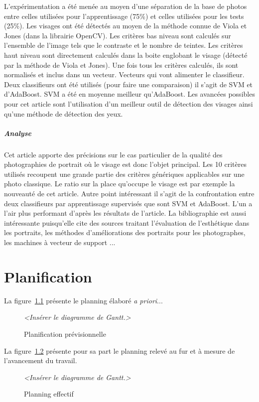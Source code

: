 \documentclass[11pt, french]{report-rd-info}
\begin{document}
L'expérimentation a été menée au moyen d’une séparation de la base de photos entre celles utilisées pour l’apprentissage (75\%) et celles utilisées pour les tests (25\%). Les visages ont été détectés au moyen de la méthode connue de Viola et Jones (dans la librairie OpenCV).
Les critères bas niveau sont calculés sur l’ensemble de l’image tels que le contraste et le nombre de teintes. Les critères haut niveau sont directement calculés dans la boite englobant le visage (détecté par la méthode de Viola et Jones). Une fois tous les critères calculés, ils sont normalisés et inclus dans un vecteur. Vecteurs qui vont alimenter le classifieur. Deux classifieurs ont été utilisés (pour faire une comparaison) il s’agit de SVM et d’AdaBoost. SVM a été en moyenne meilleur qu’AdaBoost.
Les avancées possibles pour cet article sont l’utilisation d’un meilleur outil de détection des visages ainsi qu’une méthode de détection des yeux.
\paragraph{Analyse}
Cet article apporte des précisions sur le cas particulier de la qualité des photographies de portrait où le visage est donc l’objet principal. Les 10 critères utilisés recoupent une grande partie des critères génériques applicables sur une photo classique. Le ratio sur la place qu’occupe le visage est par exemple la nouveauté de cet article.
Autre point intéressant il s’agit de la confrontation entre deux classifieurs par apprentissage supervisés que sont SVM et AdaBoost. L’un a l’air plus performant d’après les résultats de l’article. La bibliographie est aussi intéressante puisqu’elle cite des sources traitant l’évaluation de l’esthétique dans les portraits, les méthodes d’améliorations des portraits pour les photographes, les machines à vecteur de support ...
\chapter{Planification}
La figure~\ref{fig:PlanningPrevisionnel} présente le planning élaboré \emph{a priori}...
\begin{figure}
	\centering
		\emph{<Insérer le diagramme de Gantt.>}
	\caption{Planification prévisionnelle}
	\label{fig:PlanningPrevisionnel}
\end{figure}
La figure~\ref{fig:PlanningEffectif} présente pour sa part le planning relevé au fur et à mesure de l'avancement du travail.
\begin{figure}
	\centering
		\emph{<Insérer le diagramme de Gantt.>}
	\caption{Planning effectif}
	\label{fig:PlanningEffectif}
\end{figure}
\end{document}
